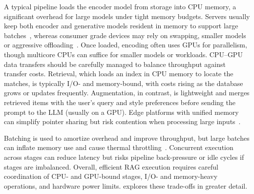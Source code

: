 A typical pipeline loads the encoder model from storage into CPU memory, a significant overhead for large models under tight memory budgets. Servers usually keep both encoder and generative models resident in memory to support large batches~\cite{jiang2024piperag, jin2024flashrag, jiang2024megascale}, whereas consumer grade devices may rely on swapping,
smaller models or aggressive offloading~\cite{EdgeRAG,NanoLLM}. Once loaded, encoding often uses GPUs for parallelism, though multicore CPUs can suffice for smaller models or workloads. CPU–GPU data transfers should be carefully managed to balance throughput against transfer costs. Retrieval, which loads an index in CPU memory to locate the \topk{} matches, is typically I/O- and memory-bound, with costs rising as the database grows or updates frequently. Augmentation, in contrast, is lightweight and merges retrieved items with the user’s query and style preferences before sending the prompt to the LLM (usually on a GPU). Edge platforms with unified memory~\cite{ying2022exploiting} can simplify pointer sharing but risk contention when processing large inputs~\cite{kim2020batch, dashti2017analyzing, cavicchioli2017memory, jeong2012qos}.

Batching is used to amortize overhead and improve throughput, but large batches can inflate memory use and cause thermal throttling~\cite{na2021scalable, stojkovic2025tapas}. Concurrent execution across stages can reduce latency but risks pipeline back-pressure or idle cycles if stages are imbalanced. Overall, efficient RAG execution requires careful coordination of CPU- and GPU-bound stages, I/O- and memory-heavy operations, and hardware power limits.  explores these trade-offs in greater detail.



